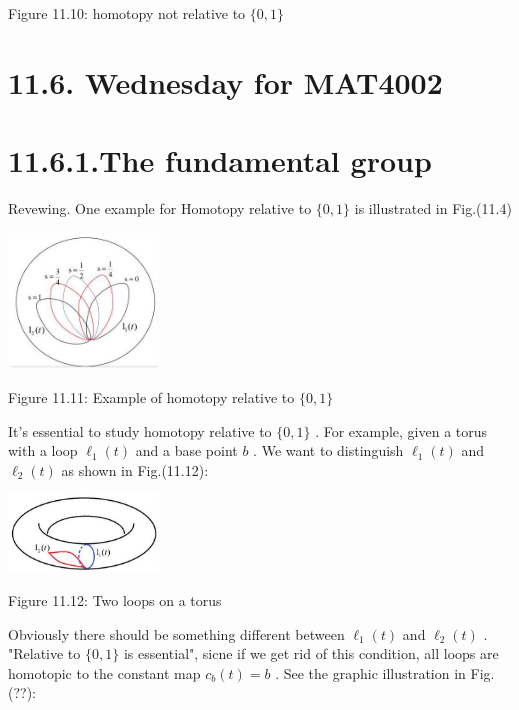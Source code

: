 Figure 11.10: homotopy not relative to \(\{ 0,1\}\)

\section*{11.6. Wednesday for MAT4002}

\section*{11.6.1.The fundamental group}

Revewing. One example for Homotopy relative to \(\{ 0,1\}\) is illustrated in Fig.(11.4)

\begin{center}
\includegraphics[max width=0.3\textwidth]{images/bo_d2bcsrref24c73avs720_114_646_571_356_322_0.jpg}
\end{center}
\hspace*{3em} 

Figure 11.11: Example of homotopy relative to \(\{ 0,1\}\)

It’s essential to study homotopy relative to \(\{ 0,1\}\) . For example, given a torus with a loop \({\ell }_{1}\left( t\right)\) and a base point \(b\) . We want to distinguish \({\ell }_{1}\left( t\right)\) and \({\ell }_{2}\left( t\right)\) as shown in Fig.(11.12):

\begin{center}
\includegraphics[max width=0.3\textwidth]{images/bo_d2bcsrref24c73avs720_114_596_1228_442_228_0.jpg}
\end{center}
\hspace*{3em} 

Figure 11.12: Two loops on a torus

Obviously there should be something different between \({\ell }_{1}\left( t\right)\) and \({\ell }_{2}\left( t\right)\) . "Relative to \(\{ 0,1\}\) is essential", sicne if we get rid of this condition, all loops are homotopic to the constant map \({c}_{b}\left( t\right)  = b\) . See the graphic illustration in Fig.(??):

